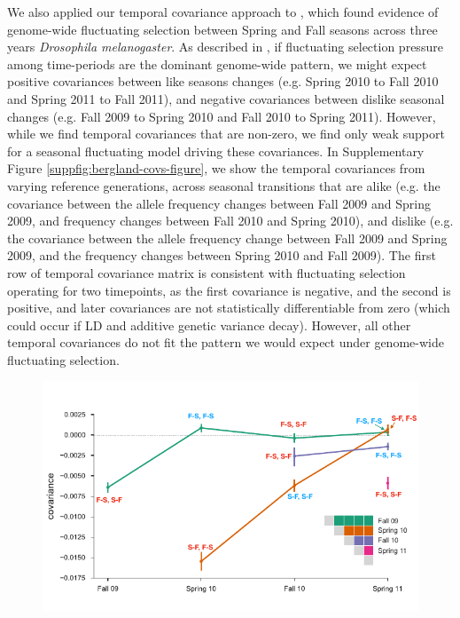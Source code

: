 \documentclass[11pt]{article}
\begin{document}
{We also applied our temporal covariance approach to \textcite{Bergland2014-ij},
which found evidence of genome-wide fluctuating selection between Spring and
Fall seasons across three years \emph{Drosophila melanogaster}. As described in
\textcite{Buffalo2019-io}, if fluctuating selection pressure among time-periods
are the dominant genome-wide pattern, we might expect positive covariances
between like seasons changes (e.g. Spring 2010 to Fall 2010 and Spring
2011 to Fall 2011), and negative covariances between dislike seasonal changes
(e.g. Fall 2009 to Spring 2010 and Fall 2010 to Spring 2011). However,
while we find temporal covariances that are non-zero, we find only weak support
for a seasonal fluctuating model driving these covariances. In Supplementary
Figure \ref{suppfig:bergland-covs-figure}, we show the temporal covariances
from varying reference generations, across seasonal transitions that are alike
(e.g.  the covariance between the allele frequency changes between Fall 2009
and Spring 2009, and frequency changes between Fall 2010 and Spring 2010), and
dislike (e.g. the covariance between the allele frequency change between Fall
2009 and Spring 2009, and the frequency changes between Spring 2010 and Fall
2009). The first row of temporal covariance matrix is consistent with
fluctuating selection operating for two timepoints, as the first covariance is
negative, and the second is positive, and later covariances are not
statistically differentiable from zero (which could occur if LD and additive
genetic variance decay). However, all other temporal covariances do not fit
the pattern we would expect under genome-wide fluctuating selection.

\begin{figure}[!ht]
  \centering
  \includegraphics[]{figures/bergland-covs-figure.pdf}


\end{figure}}
\end{document}
